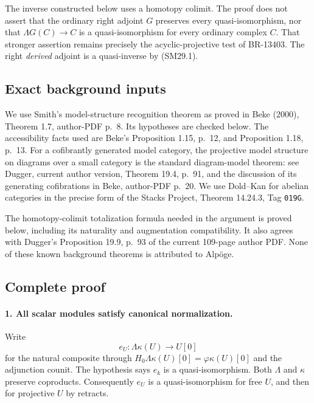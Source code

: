 The inverse constructed below uses a homotopy colimit.
The proof does not assert that the ordinary right adjoint \(G\)
preserves every quasi-isomorphism, nor that
\(\Lambda G(C)\to C\) is a quasi-isomorphism for every ordinary
complex \(C\).  That stronger assertion remains precisely the
acyclic-projective test of BR-13403.  The right \emph{derived}
adjoint is a quasi-inverse by (SM29.1).

\subsection{Exact background inputs}
We use Smith's model-structure recognition theorem as proved in
Beke (2000), Theorem 1.7, author-PDF p.~8.
Its hypotheses are checked below.  The accessibility facts used
are Beke's Proposition 1.15, p.~12, and Proposition 1.18, p.~13.
For a cofibrantly generated model category, the projective model
structure on diagrams over a small category is the standard
diagram-model theorem: see Dugger, current author version,
Theorem 19.4, p.~91, and the discussion of its generating
cofibrations in Beke, author-PDF p.~20.
We use Dold--Kan for abelian categories in the precise form of
the Stacks Project, Theorem 14.24.3, Tag \texttt{019G}.

The homotopy-colimit totalization formula needed in the argument
is proved below, including its naturality and augmentation
compatibility.  It also agrees with Dugger's Proposition 19.9,
p.~93 of the current 109-page author PDF.
None of these known background theorems is attributed to Alp\"oge.

\subsection{Complete proof}

\paragraph{1. All scalar modules satisfy canonical normalization.}
Write
\[
 e_U:\Lambda\kappa(U)\longrightarrow U[0]
 \tag{SM29.2}
\]
for the natural composite through
\(H_0\Lambda\kappa(U)[0]=\varphi\kappa(U)[0]\) and the adjunction
counit.  The hypothesis says \(e_k\) is a quasi-isomorphism.
Both \(\Lambda\) and \(\kappa\) preserve coproducts.
Consequently \(e_U\) is a quasi-isomorphism for free \(U\), and
then for projective \(U\) by retracts.

